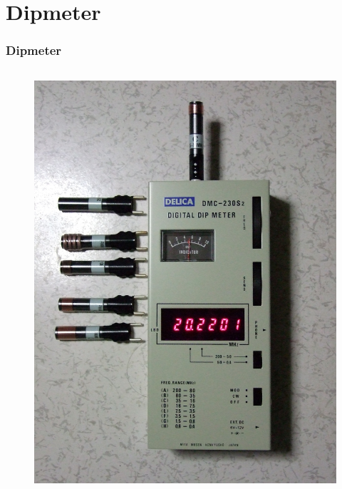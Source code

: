 \begin{frame}
\begin{columns}
\begin{flushright}
\begin{figure}
      \end{figure}
    \end{flushright}
  \end{columns}
\end{frame}

\section*{Dipmeter}

\begin{frame}
  \frametitle{Dipmeter}
  \begin{columns}
    \begin{center}
      \begin{figure}
        \includegraphics[width=\textwidth,height=.7\textheight,keepaspectratio]{a16/Dipmeter.jpg}

\end{figure}
\end{center}
\end{columns}
\end{frame}
